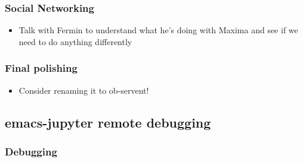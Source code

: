\documentclass[11pt]{article}
\begin{document}
\subsubsection{Social Networking}
\label{sec:org19231c9}

\begin{itemize}
\item Talk with Fermin to understand what he's doing with Maxima and see if we need to do anything differently
\end{itemize}

\subsubsection{Final polishing}
\label{sec:orgba50983}

\begin{itemize}
\item Consider renaming it to ob-servent!
\end{itemize}
\subsection{emacs-jupyter remote debugging}
\label{sec:org849b335}
\subsubsection{Debugging}
\label{sec:org4dfb825}
\end{document}
